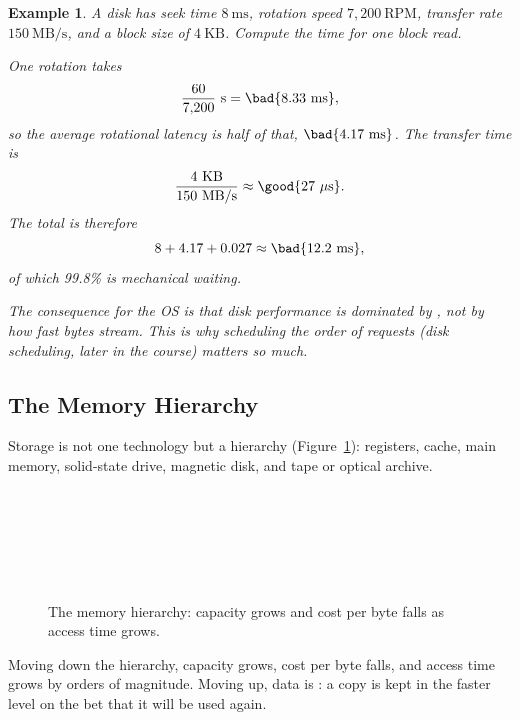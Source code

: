 \documentclass[11pt]{article}
\newtheorem{example}{Example}
\begin{document}
\begin{example}
A disk has seek time $8\ \text{ms}$, rotation speed $7{,}200\ \text{RPM}$, transfer rate $150\ \text{MB/s}$, and a block size of $4\ \text{KB}$. Compute the time for one block read.

One rotation takes
\[
\frac{60}{7{,}200}\ \text{s} = \bad{8.33\ \text{ms}},
\]
so the average rotational latency is half of that, $\bad{4.17\ \text{ms}}$. The transfer time is
\[
\frac{4\ \text{KB}}{150\ \text{MB/s}} \approx \good{27\ \mu\text{s}}.
\]
The total is therefore
\[
8 + 4.17 + 0.027 \approx \bad{12.2\ \text{ms}},
\]
of which \emph{99.8\%} is mechanical waiting.

The consequence for the OS is that disk performance is dominated by , not by how fast bytes stream. This is why scheduling the \emph{order} of requests (disk scheduling, later in the course) matters so much.
\end{example}

\subsection{The Memory Hierarchy}

Storage is not one technology but a hierarchy (Figure~\ref{fig:hierarchy}): registers, cache, main memory, solid-state drive, magnetic disk, and tape or optical archive.

\begin{figure}[ht]
\centering
\small
{}\\[0.15em]
\\[0.15em]
\\[0.15em]
\\[0.15em]
\\[0.15em]
\caption{The memory hierarchy: capacity grows and cost per byte falls as access time grows.}
\label{fig:hierarchy}
\end{figure}

Moving down the hierarchy, capacity grows, cost per byte falls, and access time grows by orders of magnitude. Moving up, data is : a copy is kept in the faster level on the bet that it will be used again.
\end{document}
